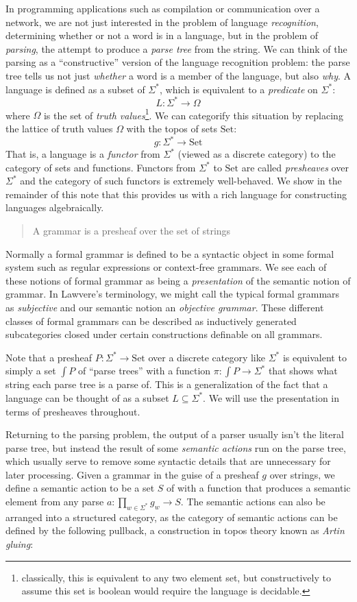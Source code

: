 \documentclass[12pt]{article}
\newcommand{\Set}{\textrm{Set}}
\begin{document}
In programming applications such as compilation or communication over
a network, we are not just interested in the problem of language
\emph{recognition}, determining whether or not a word is in a
language, but in the problem of \emph{parsing}, the attempt to produce
a \emph{parse tree} from the string. We can think of the parsing as a
``constructive'' version of the language recognition problem: the
parse tree tells us not just \emph{whether} a word is a member of the
language, but also \emph{why}. A language is defined as a subset of
$\Sigma^*$, which is equivalent to a \emph{predicate} on $\Sigma^*$:
\[ L : \Sigma^* \to \Omega \]
where $\Omega$ is the set of \emph{truth values}\footnote{classically,
this is equivalent to any two element set, but constructively to
assume this set is boolean would require the language is
decidable.}. We can categorify this situation by replacing the
lattice of truth values $\Omega$ with the topos of sets $\Set$:
\[ g : \Sigma^* \to \Set \]
That is, a language is a \emph{functor} from $\Sigma^*$ (viewed as a
discrete category) to the category of sets and functions.
Functors from $\Sigma^*$ to $\Set$ are called \emph{presheaves} over
$\Sigma^*$ and the category of such functors is extremely
well-behaved. We show in the remainder of this note that this provides
us with a rich language for constructing languages algebraically.
\begin{quote}
  A grammar is a presheaf over the set of strings
\end{quote}
Normally a formal grammar is defined to be a syntactic object in some
formal system such as regular expressions or context-free grammars.
%
We see each of these notions of formal grammar as being a
\emph{presentation} of the semantic notion of grammar. In Lawvere's
terminology, we might call the typical formal grammars as
\emph{subjective} and our semantic notion an \emph{objective grammar}. 
%
These different classes of formal grammars can be described as
inductively generated subcategories closed under certain constructions
definable on all grammars.

Note that a presheaf $P : \Sigma^* \to \Set$ over a discrete category
like $\Sigma^*$ is equivalent to simply a set $\int P$ of ``parse
trees'' with a function $\pi : \int P \to \Sigma^*$ that shows what
string each parse tree is a parse of. This is a generalization of the
fact that a language can be thought of as a subset $L \subseteq
\Sigma^*$. We will use the presentation in terms of presheaves
throughout.

Returning to the parsing problem, the output of a parser usually isn't
the literal parse tree, but instead the result of some \emph{semantic
actions} run on the parse tree, which usually serve to remove some
syntactic details that are unnecessary for later processing.
%
Given a grammar in the guise of a presheaf $g$ over strings, we define
a semantic action to be a set $S$ of with a function that produces a
semantic element from any parse $a : \prod_{w \in \Sigma^*} g_w \to
S$. The semantic actions can also be arranged into a structured
category, as the category of semantic actions can be defined by the
following pullback, a construction in topos theory known as
\emph{Artin gluing}:
\end{document}
